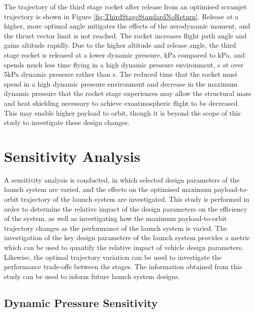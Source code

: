 The trajectory of the third stage rocket after release from an optimised scramjet trajectory is shown in Figure \ref{fig:ThirdStageStandardNoReturn}. Release at a higher, more optimal angle mitigates the effects of the aerodynamic moment, and the thrust vector limit is not reached. The rocket increases flight path angle and gains altitude rapidly.
Due to the higher altitude and release angle, the third stage rocket is released at a lower dynamic pressure, \secondthirdSeparationqCdStandardNoReturn kPa compared to \secondthirdSeparationqConstq kPa, and spends much less time flying in a high dynamic pressure environment, \thirdqOverFiveStandard s at over 5kPa dynamic pressure rather than \thirdqOverFiveConstq s. 
The reduced time that the rocket must spend in a high dynamic pressure environment and decrease in the maximum dynamic pressure that the rocket stage experiences may allow the structural mass and heat shielding necessary to achieve exoatmospheric flight to be decreased. This may enable higher payload to orbit, though it is beyond the scope of this study to investigate these design changes. 

\section{Sensitivity Analysis}

A sensitivity analysis is conducted, in which selected design parameters of the launch system are varied, and the effects on the optimised maximum payload-to-orbit trajectory of the launch system are investigated. 
This study is performed in order to determine the relative impact of the design parameters on the efficiency of the system, as well as investigating how the maximum payload-to-orbit trajectory changes as the performance of the launch system is varied. The investigation of the key design parameters of the launch system provides a metric which can be used to quantify the relative impact of vehicle design parameters. Likewise, the optimal trajectory variation can be used to investigate the performance trade-offs between the stages. 
The information obtained from this study can be used to inform future launch system designs.

\subsection{Dynamic Pressure Sensitivity}\label{sec:qvariation}

